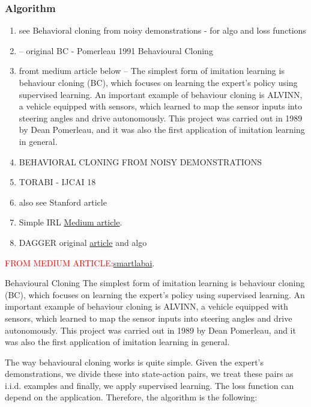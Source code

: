 \documentclass{article}
\begin{document}
\subsubsection{Algorithm}
\begin{enumerate}
\item see \citep{sasaki2020} Behavioral cloning from noisy demonstrations - for algo and loss functions

\item  \cite{Pomerleau1991} -- original BC - Pomerleau 1991 Behavioural Cloning
\item fromt medium article below -- The simplest form of imitation learning is behaviour cloning (BC), which focuses on learning the expert’s policy using supervised learning. An important example of behaviour cloning is ALVINN, a vehicle equipped with sensors, which learned to map the sensor inputs into steering angles and drive autonomously. This project was carried out in 1989 by Dean Pomerleau, and it was also the first application of imitation learning in general.

\item BEHAVIORAL CLONING FROM NOISY DEMONSTRATIONS

\item TORABI - IJCAI 18
\item also see Stanford article
\item Simple IRL \href{https://smartlabai.medium.com/a-brief-overview-of-imitation-learning-8a8a75c44a9c}{Medium article}.
\item DAGGER original \href{https://www.ri.cmu.edu/pub_files/2011/4/Ross-AISTATS11-NoRegret.pdf}{article} and algo
\end{enumerate}

\textcolor{red}{FROM MEDIUM ARTICLE:}\href{https://smartlabai.medium.com/a-brief-overview-of-imitation-learning-8a8a75c44a9c}{smartlabai}.

Behavioural Cloning
The simplest form of imitation learning is behaviour cloning (BC), which focuses on learning the expert’s policy using supervised learning. An important example of behaviour cloning is ALVINN, a vehicle equipped with sensors, which learned to map the sensor inputs into steering angles and drive autonomously. This project was carried out in 1989 by Dean Pomerleau, and it was also the first application of imitation learning in general.

The way behavioural cloning works is quite simple. Given the expert’s demonstrations, we divide these into state-action pairs, we treat these pairs as i.i.d. examples and finally, we apply supervised learning. The loss function can depend on the application. Therefore, the algorithm is the following:
\end{document}
